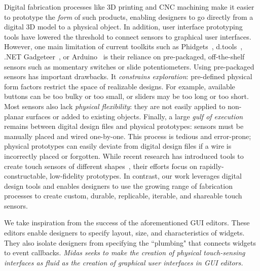 Digital fabrication processes like 3D printing and CNC machining make it easier to prototype the \emph{form} of such products, enabling designers to go directly from a digital 3D model to a physical object. In addition, user interface prototyping tools have lowered the threshold to connect sensors to graphical user interfaces. However, one main limitation of current toolkits such as Phidgets~\cite{greenberg-phidgets}, d.tools~\cite{hartmann-dtools}, .NET Gadgeteer~\cite{villar-gadgeteer}, or Arduino~\cite{arduino} is their reliance on pre-packaged, off-the-shelf sensors such as momentary switches or slide potentiometers. Using pre-packaged sensors has important drawbacks. It {\em constrains exploration}: pre-defined physical form factors restrict the space of realizable designs. For example, available buttons can be too bulky or too small, or sliders may be too long or too short. Most sensors also lack {\em physical flexibility}: they are not easily applied to non-planar surfaces or added to existing objects. Finally, a large {\em gulf of execution} remains between digital design files and physical prototypes: sensors must be manually placed and wired one-by-one. This process is tedious and error-prone; physical prototypes can easily deviate from digital design files if a wire is incorrectly placed or forgotten. While recent research has introduced tools to create touch sensors of different shapes~\cite{holman-tactiletape,hudson-boxes,wimmer-tdr}, their efforts focus on rapidly-constructable, low-fidelity prototypes. In contrast, our work leverages digital design tools and enables designers to use the growing range of fabrication processes to create custom, durable, replicable, iterable, and shareable touch sensors.

We take inspiration from the success of the aforementioned GUI editors. These editors enable designers to specify layout, size, and characteristics of widgets. They also isolate designers from specifying the ``plumbing" that connects widgets to event callbacks. {\em Midas seeks to make the creation of physical touch-sensing interfaces as fluid as the creation of graphical user interfaces in GUI editors.}

